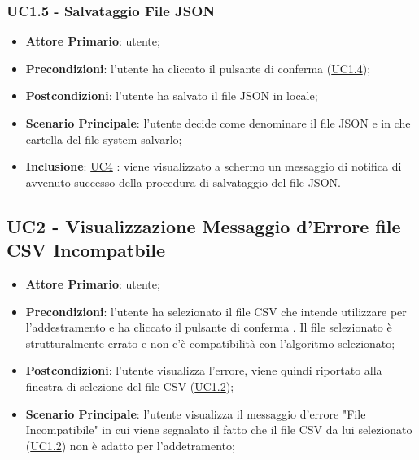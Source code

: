 	\label{par:UC1.5}
	\subsubsection{UC1.5 - Salvataggio File JSON}
		\begin{itemize}
			\item\textbf{Attore Primario}: utente;
			\item\textbf{Precondizioni}: l’utente ha cliccato il pulsante di conferma (\hyperref[par:UC1.4]{UC1.4});
			\item\textbf{Postcondizioni}: l’utente ha salvato il file JSON in locale;
			\item\textbf{Scenario Principale}: l’utente decide come denominare il file JSON e in che cartella del file system salvarlo;  
			\item\textbf{Inclusione}: \hyperref[par:UC4]{UC4} : viene visualizzato a schermo un messaggio di notifica di avvenuto successo della procedura di salvataggio del file JSON.			
		\end{itemize}


	\label{par:UC2}
	\subsection{UC2 - Visualizzazione Messaggio d'Errore file CSV Incompatbile}
		\begin{itemize}
			\item\textbf{Attore Primario}: utente;
			\item\textbf{Precondizioni}: l’utente ha selezionato il file CSV che intende utilizzare per l'addestramento e ha cliccato il pulsante di conferma . Il file selezionato è strutturalmente errato e non c'è compatibilità con l'algoritmo selezionato;
			\item\textbf{Postcondizioni}: l'utente visualizza l'errore, viene quindi riportato alla finestra di selezione del file CSV (\hyperref[par:UC1.2]{UC1.2});
			\item\textbf{Scenario Principale}: l’utente visualizza il messaggio d'errore "File Incompatibile" in cui viene segnalato il fatto che il file CSV da lui selezionato (\hyperref[par:UC1.2]{UC1.2}) non è adatto per l'addetramento;  		
		\end{itemize}



	\label{par:UC3}
